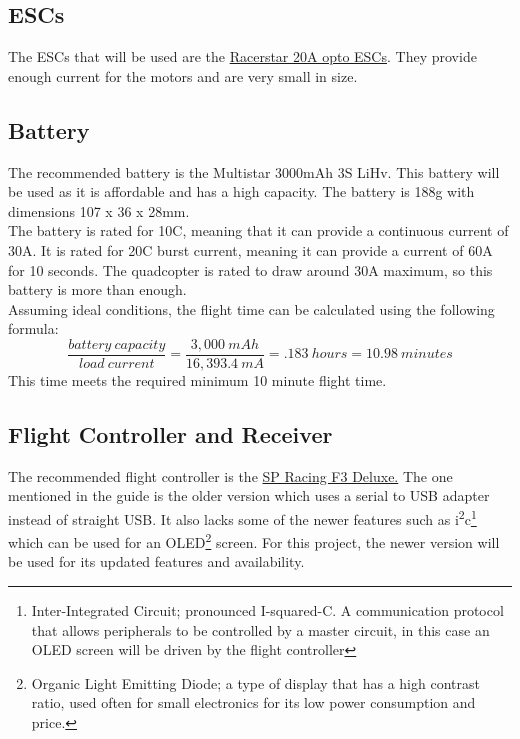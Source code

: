 \documentclass[12pt]{article}
\begin{document}
\subsection{ESCs}
The ESCs that will be used are the \href{https://www.banggood.com/4X-Racerstar-RS20A-20A-BLHELI_S-OPTO-2-4S-ESC-Support-Oneshot42-Multishot-for-FPV-Racing-p-1064324.html?rmmds=myorder}{\color{cyan}Racerstar 20A opto ESCs}. They provide enough current for the motors and are very small in size.


\subsection{Battery}
The recommended battery is the Multistar 3000mAh 3S LiHv. This battery will be used as it is affordable and has a high capacity. The battery is 188g with dimensions 107 x 36 x 28mm. 
\\

The battery is rated for 10C, meaning that it can provide a continuous current of 30A. It is rated for 20C burst current, meaning it can provide a current of 60A for 10 seconds. The quadcopter is rated to draw around 30A maximum, so this battery is more than enough.
\\

Assuming ideal conditions, the flight time can be calculated using the following formula:
\\

\begin{equation} 
\frac{battery\ capacity}{load\ current} = \frac{3,000\ mAh}{16,393.4\ mA} = .183\ hours = 10.98\ minutes
\end{equation}
This time meets the required minimum 10 minute flight time.

\subsection{Flight Controller and Receiver}
The recommended flight controller is the \href{https://www.banggood.com/Upgrade-NAZE32-F3-Flight-Controller-Acro-6-DOF-Deluxe-10-DOF-for-Multirotor-Racing-p-1010232.html?ID=17&cur_warehouse=CN}{\color{cyan}SP Racing F3 Deluxe.} The one mentioned in the guide is the older version which uses a serial to USB adapter instead of straight USB. It also lacks some of the newer features such as i\textsuperscript{2}c\footnote{Inter-Integrated Circuit; pronounced I-squared-C. A communication protocol that allows peripherals to be controlled by a master circuit, in this case an OLED screen will be driven by the flight controller} which can be used for an OLED\footnote{Organic Light Emitting Diode; a type of display that has a high contrast ratio, used often for small electronics for its low power consumption and price.} screen. For this project, the newer version will be used for its updated features and availability.
\\
\end{document}
